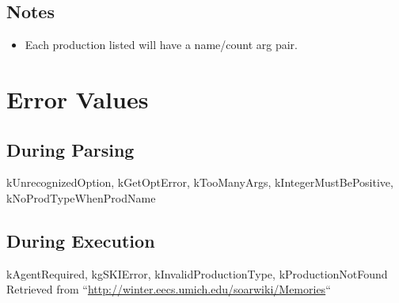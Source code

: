 \documentclass[10pt]{article}
\begin{document}
\subsection*{ Notes }
\begin{itemize}
\item  Each production listed will have a name/count arg pair. 

\end{itemize}
\section*{ Error Values }
\subsection*{ During Parsing }


 kUnrecognizedOption, kGetOptError, kTooManyArgs, kIntegerMustBePositive, kNoProdTypeWhenProdName
\subsection*{ During Execution }


 kAgentRequired, kgSKIError, kInvalidProductionType, kProductionNotFound Retrieved from ``\url{http://winter.eecs.umich.edu/soarwiki/Memories}``
\end{document}
